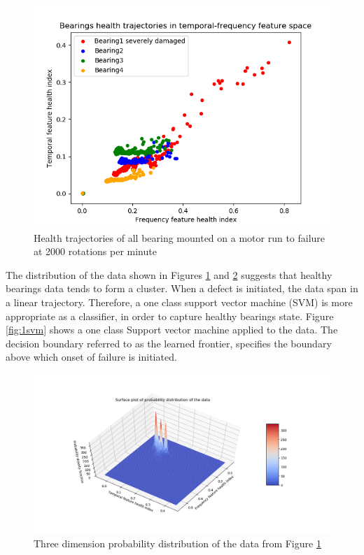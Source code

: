 \documentclass[../Main/thesis.tex]{subfiles}
\begin{document}
\begin{figure}[H] %
   \centering
   \includegraphics[width=5in]{../fig/health_plot.png} 
   \caption{Health trajectories of all bearing mounted on a motor run to failure at 2000 rotations per minute}
   \label{fig:health_plot}
\end{figure}
\justify
The distribution of the data shown in Figures \ref{fig:health_plot} and \ref{fig:pdf3d} suggests that healthy bearings data tends to form a cluster. When a defect is initiated, the data span in a linear trajectory. Therefore, a one class support vector machine (SVM) is more appropriate as a classifier, in order to capture healthy bearings state. Figure \ref{fig:1svm} shows a one class Support vector machine applied to the data. The decision boundary referred to as the learned frontier, specifies the boundary above which onset of failure is initiated.

\begin{figure}[H] %
	\centering
	\includegraphics[width=10in]{../fig/pdf3d.png} 
	\caption{Three dimension probability distribution of the data from Figure \ref{fig:health_plot}}
	\label{fig:pdf3d}
\end{figure}
\end{document}
